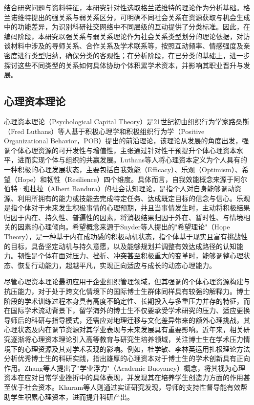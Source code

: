 结合研究问题与资料特征，本研究针对性选取格兰诺维特的理论作为分析基础。格兰诺维特提出的强关系与弱关系区分，可明确不同社会关系在资源获取与机会生成中的功能差异，为识别科研社交网络中不同层级的互动提供了分类标准。因此，在编码阶段，本研究以强关系与弱关系理论作为社会关系类型划分的理论依据，对访谈材料中涉及的导师关系、合作关系及学术联系等，按照互动频率、情感强度及亲密度进行类型归纳，确保分类的客观性；在分析阶段，在已分类的基础上，进一步探讨这些不同类型的关系如何具体协助个体积累学术资本，并影响其职业晋升与发展。

\subsection{心理资本理论}

心理资本理论（Psychological Capital Theory）是21世纪初由组织行为学家路桑斯（Fred Luthans）等人基于积极心理学和积极组织行为学（Positive Organizational Behavior，POB）提出的前沿理论，该理论从发展的角度出发，强调个体心理资源的可开发性与增值性，主张通过针对性干预提升个体心理资本水平，进而实现个体与组织的共赢发展。Luthans等人将心理资本定义为个人具有的一种积极的心理发展状态，主要包括自我效能（Efficacy）、乐观（Optimism）、希望（Hope）和韧性（Resilience）四个维度\cite{luthans2018}。具体而言，自我效能概念来源于阿尔伯特·班杜拉（Albert Bandura）的社会认知理论，是指个人对自身能够调动资源、利用所拥有的能力或技能去完成特定任务、达成既定目标的信念与信心。乐观是指个体对于未来发生积极事情的心理预期，并且当事情发生时，主动将积极结果归因于内在、持久性、普遍性的因素，将消极结果归因于外在、暂时性、与情境相关的因素的心理倾向。希望概念来源于Snyder等人提出的"希望理论"（Hope Theory），是一种基于内在成功感的积极动机状态，指个体基于现实且富有挑战性的目标，具备坚定动机与持久意愿，以及能够规划并调整有效达成路径的认知能力。韧性是个体在面对压力、挫折、冲突甚至积极重大的变革时，能够调整心理状态、恢复行动能力，超越平凡，实现正向适应与成长的动态心理能力。

尽管心理资本理论最初应用于企业组织管理领域，但其强调的个体心理资源构建与抗压能力，对于处于跨文化情境下的国际博士生群体同样具有较强的解释力。博士阶段的学术训练过程本身具有高度不确定性、长期投入与多重压力并存的特征，而在国际学术流动背景下，留学海外的博士生不仅要承受学术研究的压力、适应更换导师后的科研与指导模式，还需应对地理迁移与文化差异带来的额外心理挑战，其心理状态及内在调节资源对其学业表现与未来发展具有重要影响。近年来，相关研究逐渐将心理资本理论引入高等教育与研究生培养领域，关注博士生在学术压力情境下的心理资源及其对学术表现的影响。例如，杜学敏、李林英运用扎根理论方法分析优秀博士生的科研实践，指出雄厚的心理资本对于博士生的学术创新具有正向作用\cite{duxuemin2023}。Zhang等人提出了"学业浮力"（Academic Buoyancy）概念，将其视为心理资本在应对日常学业挫折中的具体表现，并发现其在培养学生创造力方面的作用甚至优于社会资本\cite{zhang2024a}。Khuram等人则通过实证研究发现，导师的支持性督导能有效帮助学生积累心理资本，进而提升科研产出\cite{khuram2023}。


